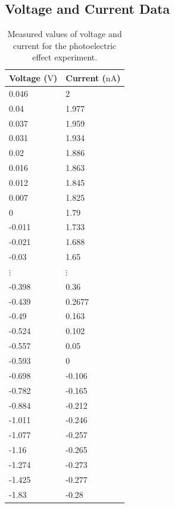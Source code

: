 \documentclass[12pt,a4paper]{article}
\begin{document}
\subsection{Voltage and Current Data}
\begin{table}[H]
    \centering
    \begin{tabular}{ll}
    \hline
        Voltage ($\mathrm{V}$) & Current ($\mathrm{nA}$) \\ \hline
        0.046 & 2 \\ 
        0.04 & 1.977 \\ 
        0.037 & 1.959 \\ 
        0.031 & 1.934 \\ 
        0.02 & 1.886 \\ 
        0.016 & 1.863 \\ 
        0.012 & 1.845 \\ 
        0.007 & 1.825 \\ 
        0 & 1.79 \\ 
        -0.011 & 1.733 \\ 
        -0.021 & 1.688 \\ 
        -0.03 & 1.65 \\ 
        $\vdots $ & $\vdots $ \\
        -0.398 & 0.36 \\ 
        -0.439 & 0.2677 \\ 
        -0.49 & 0.163 \\ 
        -0.524 & 0.102 \\ 
        -0.557 & 0.05 \\ 
        -0.593 & 0 \\ 
        -0.698 & -0.106 \\ 
        -0.782 & -0.165 \\ 
        -0.884 & -0.212 \\ 
        -1.011 & -0.246 \\ 
        -1.077 & -0.257 \\ 
        -1.16 & -0.265 \\ 
        -1.274 & -0.273 \\ 
        -1.425 & -0.277 \\ 
        -1.83 & -0.28 \\ \hline
    \end{tabular}
    \caption{Measured values of voltage and current for the photoelectric effect experiment.}
    \label{tab:volts_v_amps}
\end{table}
\end{document}
